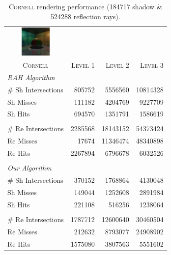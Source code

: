 \documentclass{egpubl}
\begin{document}
\begin{table}[!htb]
\begin{center}
\fontsize{7}{9}
\selectfont
\begin{tabular}{l|rrr}
    \multicolumn{1}{c}{\includegraphics[width=1.5cm]{images/cornell}} & & \\
    \multicolumn{1}{c|}{\textsc{Cornell}} & \textsc{Level 1} & \textsc{Level 2} & \textsc{Level 3}\\
    \hline
    \emph{RAH Algorithm} & & \\
    \hline
    \quad \# Sh Intersections   & 805752	 & 5556560		& 10814328	 \\
    \quad Sh Misses             & 111182	 & 4204769	    & 9227709	 \\
    \quad Sh Hits               & 694570	 & 1351791		& 1586619	 \\
    & & \\
    \quad \# Re Intersections   & 2285568	 & 18143152	    & 54373424	 \\
    \quad Re Misses             & 17674		 & 11346474	    & 48340898	 \\
    \quad Re Hits               & 2267894	 & 6796678	    & 6032526    \\

    & & \\

    \hline
    \emph{Our Algorithm} & & \\
    \hline
    \quad \# Sh Intersections   & 370152		 & 1768864	    & 4130048	 \\
    \quad Sh Misses             & 149044		 & 1252608		& 2891984	 \\
    \quad Sh Hits               & 221108		 & 516256	    & 1238064	 \\
    & & \\
    \quad \# Re Intersections   & 1787712	     & 12600640	    & 30460504	 \\
    \quad Re Misses             & 212632		 & 8793077	    & 24908902   \\
    \quad Re Hits               & 1575080		 & 3807563	    & 5551602	 \\
\end{tabular}
\end{center}
\caption{\label{table:cornell-results}
\textsc{Cornell} rendering performance (184717 shadow \& 524288 reflection rays).}
\end{table}
\end{document}
